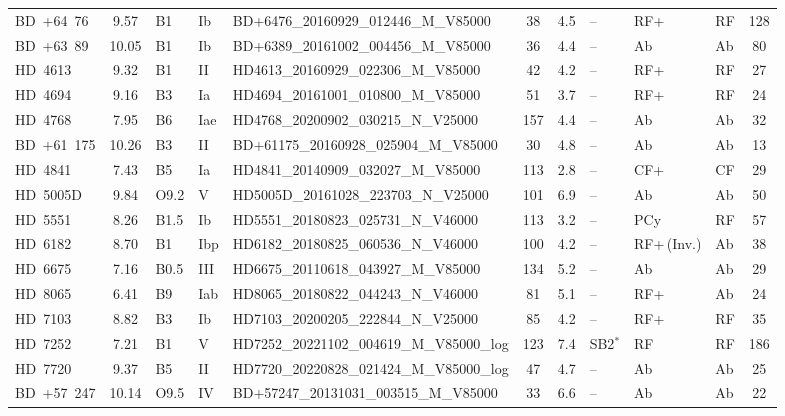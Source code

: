 {\begin{landscape}
\begin{longtable}{lclllcclllc}
\noalign{\smallskip}
BD~+64~76 & 9.57 & B1 & Ib & BD+6476\_20160929\_012446\_M\_V85000 & 38 & 4.5 & -- & RF+ & RF & 128 \\
\noalign{\smallskip}
BD~+63~89 & 10.05 & B1 & Ib & BD+6389\_20161002\_004456\_M\_V85000 & 36 & 4.4 & -- & Ab & Ab & 80 \\
\noalign{\smallskip}
HD~4613 & 9.32 & B1 & II & HD4613\_20160929\_022306\_M\_V85000 & 42 & 4.2 & -- & RF+ & RF & 27 \\
\noalign{\smallskip}
HD~4694 & 9.16 & B3 & Ia & HD4694\_20161001\_010800\_M\_V85000 & 51 & 3.7 & -- & RF+ & RF & 24 \\
\noalign{\smallskip}
HD~4768 & 7.95 & B6 & Iae & HD4768\_20200902\_030215\_N\_V25000 & 157 & 4.4 & -- & Ab & Ab & 32 \\
\noalign{\smallskip}
BD~+61~175 & 10.26 & B3 & II & BD+61175\_20160928\_025904\_M\_V85000 & 30 & 4.8 & -- & Ab & Ab & 13 \\
\noalign{\smallskip}
HD~4841 & 7.43 & B5 & Ia & HD4841\_20140909\_032027\_M\_V85000 & 113 & 2.8 & -- & CF+ & CF & 29 \\
\noalign{\smallskip}
HD~5005D & 9.84 & O9.2 & V & HD5005D\_20161028\_223703\_N\_V25000 & 101 & 6.9 & -- & Ab & Ab & 50 \\
\noalign{\smallskip}
HD~5551 & 8.26 & B1.5 & Ib & HD5551\_20180823\_025731\_N\_V46000 & 113 & 3.2 & -- & PCy & RF & 57 \\
\noalign{\smallskip}
HD~6182 & 8.70 & B1 & Ibp & HD6182\_20180825\_060536\_N\_V46000 & 100 & 4.2 & -- & RF+\,(Inv.) & Ab & 38 \\
\noalign{\smallskip}
HD~6675 & 7.16 & B0.5 & III & HD6675\_20110618\_043927\_M\_V85000 & 134 & 5.2 & -- & Ab & Ab & 29 \\
\noalign{\smallskip}
HD~8065 & 6.41 & B9 & Iab & HD8065\_20180822\_044243\_N\_V46000 & 81 & 5.1 & -- & RF+ & Ab & 24 \\
\noalign{\smallskip}
HD~7103 & 8.82 & B3 & Ib & HD7103\_20200205\_222844\_N\_V25000 & 85 & 4.2 & -- & RF+ & RF & 35 \\
\noalign{\smallskip}
HD~7252 & 7.21 & B1 & V & HD7252\_20221102\_004619\_M\_V85000\_log & 123 & 7.4 & SB2$^{*}$ & RF & RF & 186 \\
\noalign{\smallskip}
HD~7720 & 9.37 & B5 & II & HD7720\_20220828\_021424\_M\_V85000\_log & 47 & 4.7 & -- & Ab & Ab & 25 \\
\noalign{\smallskip}
BD~+57~247 & 10.14 & O9.5 & IV & BD+57247\_20131031\_003515\_M\_V85000 & 33 & 6.6 & -- & Ab & Ab & 22 \\

\end{longtable}
\end{landscape}}
